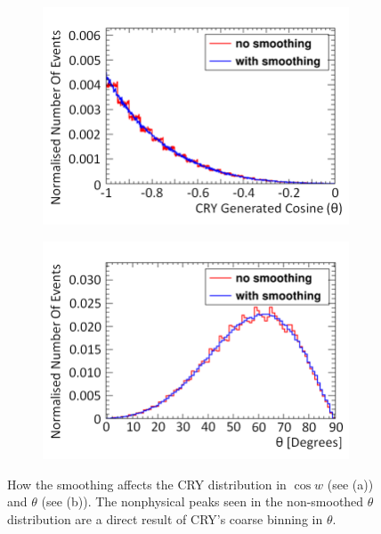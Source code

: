 \begin{figure}[!h]
\centering
\begin{subfigure}{.5\textwidth}
  \centering
  \includegraphics[width=\linewidth]{Chapter4/Figs/Raster/CryPlots/CrySmoothingCosineMedText.png}
  \captionsetup{width=.9\linewidth}
  \caption{}
  \label{subFig:CrySmoothingCosine}
\end{subfigure}%
\begin{subfigure}{.5\textwidth}
  \centering
  \includegraphics[width=\linewidth]{Chapter4/Figs/Raster/CryPlots/CrySmoothingThetaMedText.png}
  \captionsetup{width=.9\linewidth}
  \caption{}
  \label{subFig:CrySmoothingTheta}
\end{subfigure}
\caption{How the smoothing affects the CRY distribution in $\cos{w}$ (see (a)) and $\theta$ (see (b)). The nonphysical peaks seen in the non-smoothed $\theta$ distribution are a direct result of CRY's coarse binning in $\theta$.}
\label{fig:CrySmoothingCosTheta}
\end{figure}

